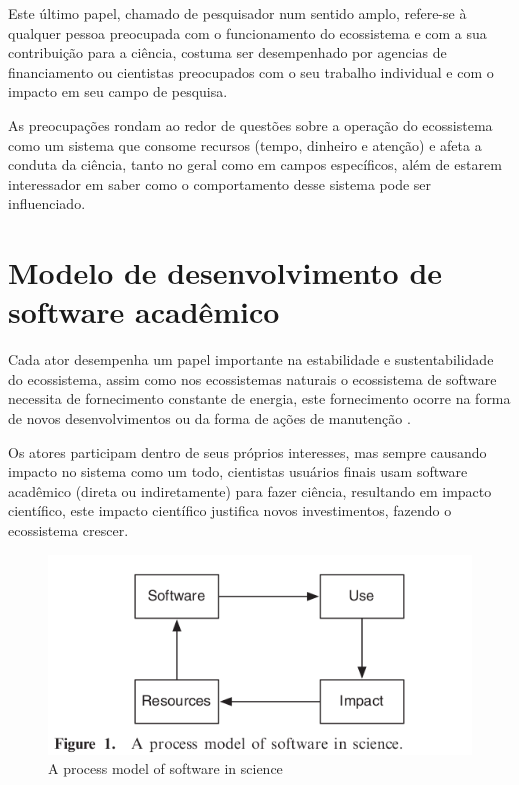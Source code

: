 Este último papel, chamado de pesquisador num sentido amplo, refere-se à
qualquer pessoa preocupada com o funcionamento do ecossistema e com a sua
contribuição para a ciência, costuma ser desempenhado por agencias de
financiamento ou cientistas preocupados com o seu trabalho individual e com o
impacto em seu campo de pesquisa.

As preocupações rondam ao redor de questões sobre a operação do ecossistema
como um sistema que consome recursos (tempo, dinheiro e atenção) e afeta a
conduta da ciência, tanto no geral como em campos específicos, além de estarem
interessador em saber como o comportamento desse sistema pode ser influenciado.

\section{Modelo de desenvolvimento de software acadêmico}


Cada ator desempenha um papel importante na estabilidade e sustentabilidade do
ecossistema, assim como nos ecossistemas naturais o ecossistema de software
necessita de fornecimento constante de energia, este fornecimento ocorre na
forma de novos desenvolvimentos ou da forma de ações de manutenção
\cite{dhungana2010software}.

Os atores participam dentro de seus próprios interesses, mas sempre causando
impacto no sistema como um todo, cientistas usuários finais usam software
acadêmico (direta ou indiretamente) para fazer ciência, resultando em impacto
científico, este impacto científico justifica novos investimentos, fazendo o
ecossistema crescer.


\begin{figure}[h]
  \center
  \includegraphics[scale=0.5]{imagens/process-model-scientific-software.png}
  \caption{A process model of software in science \cite{howison2015understanding}}
  \label{process-model-scientific-software}
\end{figure}


